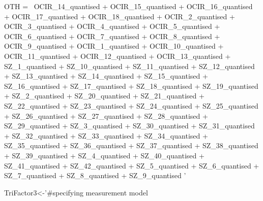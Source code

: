 \documentclass[]{article}
\newenvironment{Shaded}{\begin{snugshade}}{\end{snugshade}}
\newcommand{\StringTok}[1]{\textcolor[rgb]{0.31,0.60,0.02}{#1}}
\newcommand{\NormalTok}[1]{#1}
\begin{document}
\begin{Shaded}
\begin{Highlighting}[]
\StringTok{OTH =~ OCIR_14_quantised    +   }
\StringTok{       OCIR_15_quantised    +   }
\StringTok{       OCIR_16_quantised    +   }
\StringTok{       OCIR_17_quantised    +   }
\StringTok{       OCIR_18_quantised    +   }
\StringTok{       OCIR_2_quantised +   }
\StringTok{       OCIR_3_quantised +   }
\StringTok{       OCIR_4_quantised +   }
\StringTok{       OCIR_5_quantised +   }
\StringTok{       OCIR_6_quantised +   }
\StringTok{       OCIR_7_quantised +   }
\StringTok{       OCIR_8_quantised +   }
\StringTok{       OCIR_9_quantised +   }
\StringTok{       OCIR_1_quantised +   }
\StringTok{       OCIR_10_quantised    +   }
\StringTok{       OCIR_11_quantised    +   }
\StringTok{       OCIR_12_quantised    +   }
\StringTok{       OCIR_13_quantised  +}
\StringTok{      SZ_1_quantised    +}
\StringTok{      SZ_10_quantised   +   }
\StringTok{      SZ_11_quantised + }
\StringTok{      SZ_12_quantised + }
\StringTok{      SZ_13_quantised + }
\StringTok{      SZ_14_quantised + }
\StringTok{      SZ_15_quantised + }
\StringTok{      SZ_16_quantised + }
\StringTok{      SZ_17_quantised + }
\StringTok{      SZ_18_quantised + }
\StringTok{      SZ_19_quantised + }
\StringTok{      SZ_2_quantised + }
\StringTok{      SZ_20_quantised + }
\StringTok{      SZ_21_quantised + }
\StringTok{      SZ_22_quantised + }
\StringTok{      SZ_23_quantised + }
\StringTok{      SZ_24_quantised + }
\StringTok{      SZ_25_quantised + }
\StringTok{      SZ_26_quantised + }
\StringTok{      SZ_27_quantised + }
\StringTok{      SZ_28_quantised + }
\StringTok{      SZ_29_quantised + }
\StringTok{      SZ_3_quantised + }
\StringTok{      SZ_30_quantised + }
\StringTok{      SZ_31_quantised + }
\StringTok{      SZ_32_quantised + }
\StringTok{      SZ_33_quantised + }
\StringTok{      SZ_34_quantised + }
\StringTok{      SZ_35_quantised + }
\StringTok{      SZ_36_quantised + }
\StringTok{      SZ_37_quantised + }
\StringTok{      SZ_38_quantised + }
\StringTok{      SZ_39_quantised + }
\StringTok{      SZ_4_quantised + }
\StringTok{      SZ_40_quantised + }
\StringTok{      SZ_41_quantised + }
\StringTok{      SZ_42_quantised + }
\StringTok{      SZ_5_quantised + }
\StringTok{      SZ_6_quantised + }
\StringTok{      SZ_7_quantised + }
\StringTok{      SZ_8_quantised + }
\StringTok{      SZ_9_quantised}
\StringTok{'}

\NormalTok{TriFactor3<-}\StringTok{'#specifying measurement model}


\end{Highlighting}
\end{Shaded}
\end{document}
